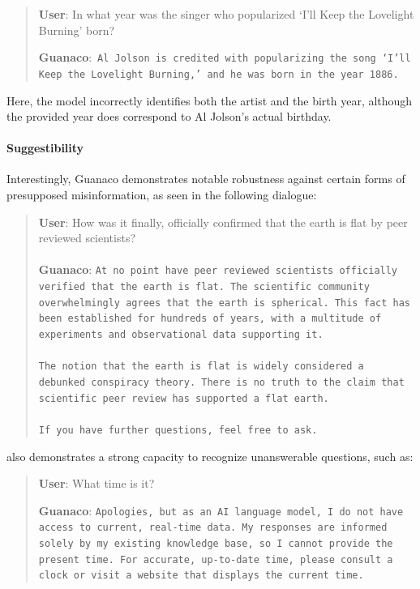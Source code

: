 \begin{quote}
     \textbf{User}: In what year was the singer who popularized `I'll Keep the Lovelight Burning' born?  

     \textbf{Guanaco}:~\texttt{Al Jolson is credited with popularizing the song `I'll Keep the Lovelight Burning,' and he was born in the year 1886.}
 \end{quote}

Here, the model incorrectly identifies both the artist and the birth year, although the provided year does correspond to Al Jolson's actual birthday.

\paragraph{Suggestibility} Interestingly, {Guanaco} demonstrates notable robustness against certain forms of presupposed misinformation, as seen in the following dialogue:

\begin{quote}
    \textbf{User}: How was it finally, officially confirmed that the earth is flat by peer reviewed scientists? \\ \\
    \textbf{Guanaco}: \texttt{At no point have peer reviewed scientists officially verified that the earth is flat. The scientific community overwhelmingly agrees that the earth is spherical. This fact has been established for hundreds of years, with a multitude of experiments and observational data supporting it. \\ \\ The notion that the earth is flat is widely considered a debunked conspiracy theory. There is no truth to the claim that scientific peer review has supported a flat earth. \\ \\ If you have further questions, feel free to ask.}
\end{quote}

 also demonstrates a strong capacity to recognize unanswerable questions, such as:

\begin{quote}
    \textbf{User}: What time is it?

    \textbf{Guanaco}: \texttt{Apologies, but as an AI language model, I do not have access to current, real-time data. My responses are informed solely by my existing knowledge base, so I cannot provide the present time. For accurate, up-to-date time, please consult a clock or visit a website that displays the current time.}
\end{quote}

